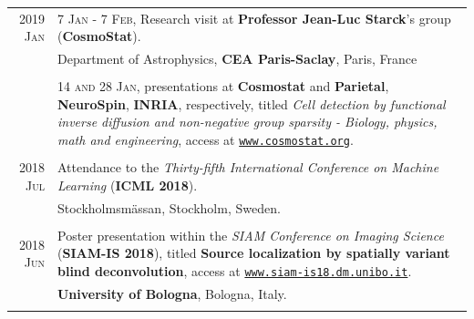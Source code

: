 \documentclass[a4paper,10pt]{article}
\begin{document}
    \vspace{-10pt}
    
    \begin{longtable}[H]{r|p{13.5cm}}
    
      \textsc{2019 Jan} & \textsc{7 Jan - 7 Feb}, Research visit at \textbf{Professor Jean-Luc Starck}'s group (\textbf{CosmoStat}). \\
                        & \footnotesize{Department of Astrophysics, \textbf{CEA Paris-Saclay}, Paris, France} \\
                        & \\
                        & \textsc{14 and 28 Jan}, presentations at \textbf{Cosmostat} and \textbf{Parietal}, \textbf{NeuroSpin}, \textbf{INRIA}, respectively, titled \emph{Cell detection by functional inverse diffusion and non-negative group sparsity - Biology, physics, math and engineering}, access at \href{http://www.cosmostat.org/events/cosmoclub/cosmosclub-pol}{\texttt{www.cosmostat.org}}. \\
      \multicolumn{2}{c}{} \\
    
      \textsc{2018 Jul} & Attendance to the \emph{Thirty-fifth International Conference on Machine
						  Learning} (\textbf{ICML 2018}). \\
						& \footnotesize{Stockholmsm\"{a}ssan, Stockholm, Sweden.} \\
	  \multicolumn{2}{c}{} \\
						
      \textsc{2018 Jun} & Poster presentation within the \emph{SIAM Conference on Imaging Science}
			  (\textbf{SIAM-IS 2018}), titled \textbf{Source localization by spatially
			  variant blind deconvolution}, access at \href{https://www.siam-is18.dm.unibo.it/uploads/store/a7a8b242b168225d0be8998fa373f58b.pdf}{\texttt{www.siam-is18.dm.unibo.it}}. \\
			& \footnotesize{\textbf{University of Bologna}, Bologna, Italy.}\\
      \multicolumn{2}{c}{} \\
    

\end{longtable}
\end{document}
